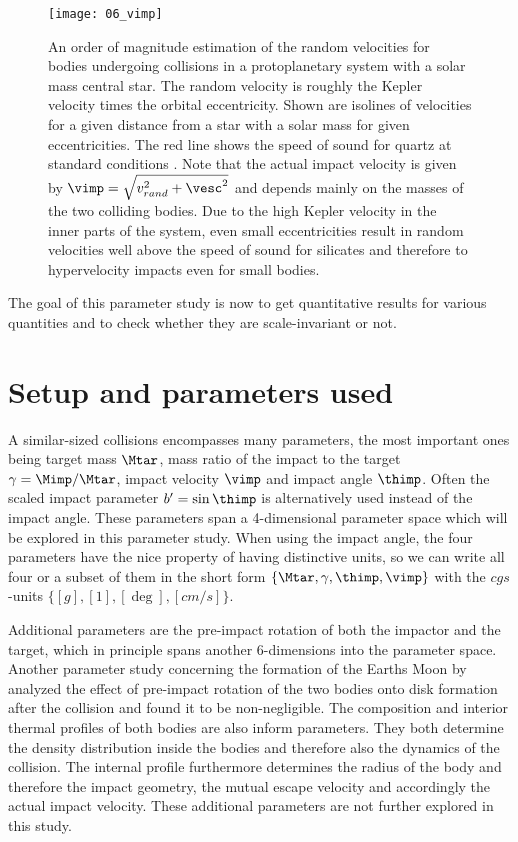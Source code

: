 \begin{figure}
\begin{center}
\texttt{[image: 06\_vimp]}
\caption{An order of magnitude estimation of the random velocities for bodies undergoing collisions in a protoplanetary system with a solar mass central star. The random velocity is roughly the Kepler velocity times the orbital eccentricity. Shown are isolines of velocities for a given distance from a star with a solar mass for given eccentricities. The red line shows the speed of sound for quartz at standard conditions \cite{Melosh:2007p3502}. Note that the actual impact velocity is given by $\vimp = \sqrt{ v_{rand}^2 + \vesc^2}$ and depends mainly on the masses of the two colliding bodies. Due to the high Kepler velocity in the inner parts of the system, even small eccentricities result in random velocities well above the speed of sound for silicates and therefore to hypervelocity impacts even for small bodies.}
\label{ch03_fig06}
\end{center}
\end{figure}
The goal of this parameter study is now to get quantitative results for various quantities and to check whether they are scale-invariant or not.

\section{Setup and parameters used}
A similar-sized collisions encompasses many parameters, the most important ones being target mass $\Mtar$, mass ratio of the impact to the target $\gamma = \Mimp / \Mtar$, impact velocity $\vimp$ and impact angle $\thimp$. Often the scaled impact parameter $b'=\sin{\thimp}$ is alternatively used instead of the impact angle. These parameters span a 4-dimensional parameter space which will be explored in this parameter study. When using the impact angle, the four parameters have the nice property of having distinctive units, so we can write all four or a subset of them in the short form $\{\Mtar, \gamma, \thimp, \vimp\}$ with the $cgs$-units $\{[g], [1], [\deg], [cm/s]\}$.

Additional parameters are the pre-impact rotation of both the impactor and the target, which in principle spans another 6-dimensions into the parameter space. Another parameter study concerning the formation of the Earths Moon by \cite{Canup:2008p3551} analyzed the effect of pre-impact rotation of the two bodies onto disk formation after the collision and found it to be non-negligible. The composition and interior thermal profiles of both bodies are also inform parameters. They both determine the density distribution inside the bodies and therefore also the dynamics of the collision. The internal profile furthermore determines the radius of the body and therefore the impact geometry, the mutual escape velocity and accordingly the actual impact velocity. These additional parameters are not further explored in this study.

